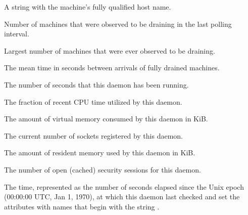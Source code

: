 \begin{description}
\item[\AdAttr{Machine}:] A string with the machine's fully qualified 
  host name.

\item[\AdAttr{MachinesDraining}:] Number of machines that were observed
  to be draining in the last polling interval.

\item[\AdAttr{MachinesDrainingPeak}:] Largest number of machines that were
ever observed to be draining.

\item[\AdAttr{MeanDrainedArrived}:] The mean time in seconds 
between arrivals of fully drained machines.

\item[\AdAttr{MonitorSelfAge}:] The number of seconds that this daemon
  has been running.

\item[\AdAttr{MonitorSelfCPUUsage}:] The fraction of recent CPU time utilized
  by this daemon. 

\item[\AdAttr{MonitorSelfImageSize}:] The amount of virtual memory consumed by
  this daemon in KiB.

\item[\AdAttr{MonitorSelfRegisteredSocketCount}:] The current number of sockets
  registered by this daemon.

\item[\AdAttr{MonitorSelfResidentSetSize}:] The amount of resident memory
  used by this daemon in KiB.

\item[\AdAttr{MonitorSelfSecuritySessions}:] The number of open (cached)
  security sessions for this daemon.

\item[\AdAttr{MonitorSelfTime}:] The  time, represented as the number of
  seconds elapsed since the Unix epoch (00:00:00 UTC, Jan 1, 1970),
  at which this daemon last checked and set the attributes with names that
  begin with the string .
  

\end{description}
